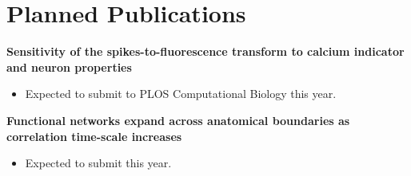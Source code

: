 \documentclass[a4paper,12pt]{article}
\begin{document}
\section*{Planned Publications}
  \textbf{Sensitivity of the spikes-to-fluorescence transform to calcium indicator and neuron properties}
  \begin{itemize}    
      \item Expected to submit to PLOS Computational Biology this year.
  \end{itemize}

  \noindent
  \textbf{Functional networks expand across anatomical boundaries as correlation time-scale increases}
  \begin{itemize}
    \item Expected to submit this year.
  \end{itemize}
\end{document}
